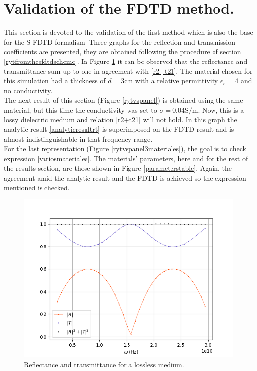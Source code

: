 \documentclass[12pt, oneside]{book}
\begin{document}
\section{Validation of the FDTD method.}
This section is devoted to the validation of the first method which is also the base for the S-FDTD formalism. Three graphs for the reflection and transmission coefficients are presented, they are obtained following the procedure of section \ref{rytfromthesfdtdscheme}. In Figure \ref{r2+t2=1} it can be observed that the reflectance and transmittance sum up to one in agreement with \ref{r2+t21}. The material chosen for this simulation had a thickness of $d=3\text{cm}$ with a relative permittivity $\epsilon_r=4$ and no conductivity.\\
\indent The next result of this section (Figure \ref{rytvspanel}) is obtained using the same material, but this time the conductivity was set to $\sigma=0.04 \text{S/m}$. Now, this is a lossy dielectric medium and relation \ref{r2+t21} will not hold. In this graph the analytic result \ref{analyticresultrt} is superimposed on the FDTD result and is almost indistinguishable in that frequency range. \\
\indent For the last representation (Figure \ref{rytvspanel3materiales}), the goal is to check expression \ref{variosmateriales}. The materials' parameters, here and for the rest of the results section, are those shown in Figure \ref{parameterstable}. Again, the agreement amid the analytic result and the FDTD is achieved so the expression mentioned is checked.

\begin{figure}
\centering
\includegraphics[scale=0.7]{rytlosslessmedium(1).png}
\caption{Reflectance and transmittance for a lossless medium.}\label{r2+t2=1}
\end{figure}
\end{document}
